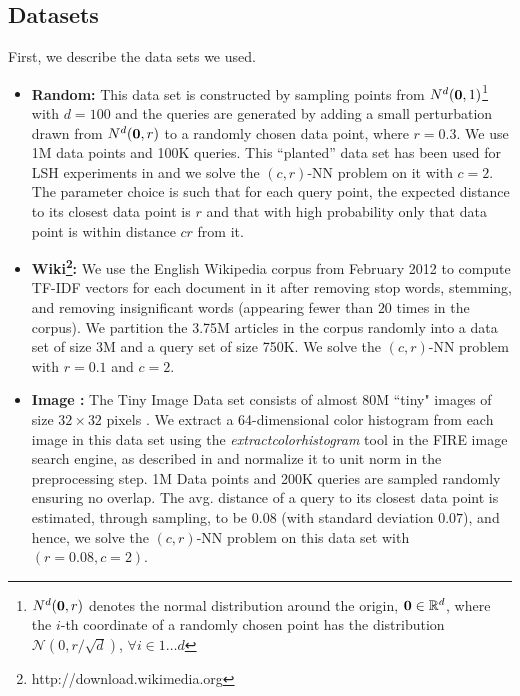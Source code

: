 \documentclass{acm_proc_article-sp}
\numberwithin{equation}{section}
\numberwithin{figure}{section}
\begin{document}
\subsection{Datasets} 
First, we describe the data sets we used.   
\begin{itemize}
\item{ \bf Random:}  
This data set is constructed by sampling points from $N^d({\bf 0},1)$\footnote{$N^d({\bf 0},r)$ denotes the normal distribution around the origin, ${\bf 0} \in \mathbb{R}^d$, where the $i$-th coordinate of a randomly chosen point has the distribution $\mathcal{N}(0,r/\sqrt{d})$, $\forall i \in 1 \ldots d$} with $d = 100$ and the queries are generated by adding a small perturbation drawn from $N^d({\bf 0},r)$ to a randomly chosen data point, where $r = 0.3$. We use 1M data points and 100K queries. This ``planted'' data set has been used for LSH experiments in \cite{DIIM04} and we solve the $(c,r)$-NN problem on it with $c = 2$. The parameter choice is such that for each query point, the expected distance to its closest data point is $r$ and that with high probability only that data point is within distance $cr$ from it.





\item{\bf Wiki\footnote{http://download.wikimedia.org}:}
We use the English Wikipedia corpus from February 2012 to compute TF-IDF vectors for each document in it after removing stop words, stemming, and removing insignificant words (appearing fewer than $20$ times in the corpus). We partition the 3.75M articles in the corpus randomly into a data set of size 3M and a query set of size 750K. We solve the $(c,r)$-NN problem with $r = 0.1$ and $c = 2$. 

\item{\bf Image \cite{TinyImages}:} 
The Tiny Image Data set consists of almost $80$M ``tiny" images of size $32\times 32$ pixels \cite{TinyImages}. We extract a 64-dimensional color histogram from each image in this data set using the {\it extractcolorhistogram} tool in the FIRE image search engine, as described in \cite{Charikar:multiprobe, Fire} and normalize it to unit norm in the preprocessing step. 1M Data points and 200K queries are sampled randomly ensuring no overlap. The avg. distance of a query to its closest data point is estimated, through sampling, to be $0.08$ (with standard deviation $0.07$), and hence, we solve the $(c,r)$-NN problem on this data set with $(r = 0.08, c = 2)$.  
\end{itemize}
\end{document}
